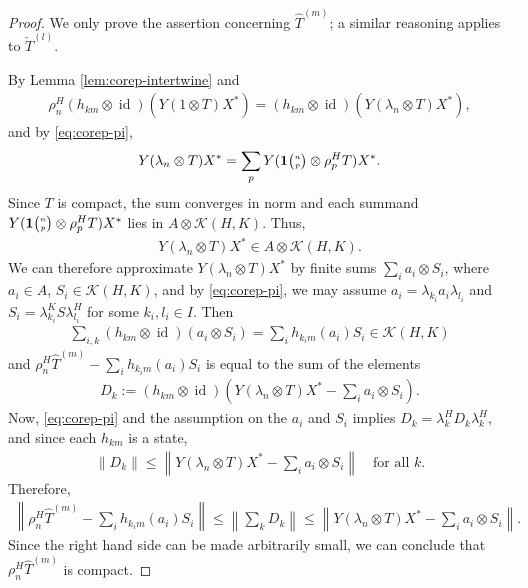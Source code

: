 \documentclass[11pt]{article}
\DeclareMathOperator{\id}{id}
\newcommand{\Grt}[3]{#1{\tiny {\begin{pmatrix} #2\\#3\end{pmatrix}}}}
\newcommand{\UnitC}[2]{\Grt{\mathbf{1}}{#1}{#2}}
\theoremstyle{definition}
\numberwithin{equation}{section}
\begin{document}
\begin{proof}
  We only prove the assertion concerning $\hat T^{(m)}$; a similar
  reasoning applies to $\check T^{(l)}$.

By Lemma \ref{lem:corep-intertwine} and
  \begin{align*}
    \rho^{H}_{n}(h_{km} \otimes \id)(Y(1\otimes T)X^{*}) = 
    (h_{km} \otimes \id)(Y(\lambda_{n} \otimes T)X^{*}),
  \end{align*}
and  by \eqref{eq:corep-pi}, 
  \begin{align*}
    Y(\lambda_{n} \otimes T)X^{*} =  \sum_{p} Y(\UnitC{n}{p} \otimes \rho^{H}_{p}T)X^{*}.
  \end{align*}
  Since $T$ is compact, the sum converges in norm and each summand $Y(\UnitC{n}{p} \otimes
  \rho^{H}_{p}T)X^{*}$ lies in $A \otimes \mathcal{K}(H,K)$. Thus,
  \begin{align*}
    Y(\lambda_{n} \otimes T)X^{*} \in A \otimes \mathcal{K}(H,K).
  \end{align*}
 We can therefore approximate $Y(\lambda_{n}
  \otimes T)X^{*}$ by finite sums $\sum_{i} a_{i} \otimes S_{i}$,
  where $a_{i} \in A$, $S_{i} \in \mathcal{K}(H,K)$, and by
  \eqref{eq:corep-pi}, we may assume $a_{i}=\lambda_{k_{i}}a_{i}
  \lambda_{l_{i}}$ and $S_{i}=\lambda_{k_{i}}^{K}S\lambda_{l_{i}}^{H}$
  for some $k_{i},l_{i}\in I$. Then
  \begin{align*}
\sum_{i,k}    (h_{km} \otimes \id)(a_{i} \otimes S_{i}) = \sum_{i}
h_{k_{i}m}(a_{i})S_{i} \in \mathcal{K}(H,K)
  \end{align*}
and  $  \rho^{H}_{n}\hat T^{(m)} - \sum_{i}
h_{k_{i}m}(a_{i})S_{i}$ is equal to the sum of the elements
\begin{align*}
  D_{k}:=   (h_{km} \otimes \id)\left(Y(\lambda_{n} \otimes T)X^{*} -
    \sum_{i}a_{i} \otimes S_{i}\right).
\end{align*}
Now, \eqref{eq:corep-pi} and the assumption on the $a_{i}$ and $S_{i}$
implies $D_{k} = \lambda_{k}^{H}D_{k}\lambda_{k}^{H}$, and  since each $h_{km}$ is a state,
\begin{align*}
  \|D_{k}\| \leq \left\|Y(\lambda_{n} \otimes T)X^{*} -
    \sum_{i}a_{i} \otimes S_{i}\right\| \quad\text{for all } k.
\end{align*}
Therefore, 
\begin{align*}
\left\|    \rho^{H}_{n}\hat T^{(m)} - \sum_{i}
h_{k_{i}m}(a_{i})S_{i}\right\| \leq \left\|\sum_{k} D_{k}\right\| \leq \left\|Y(\lambda_{n} \otimes T)X^{*} -
    \sum_{i}a_{i} \otimes S_{i}\right\|.
\end{align*}
Since the right hand side can be made arbitrarily small, we can
conclude that $\rho^{H}_{n}\hat T^{(m)}$ is compact. 
\end{proof}
\end{document}
